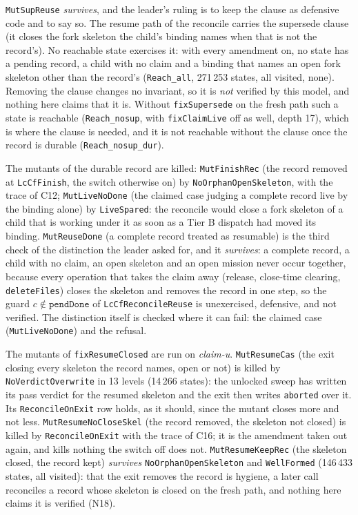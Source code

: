 \documentclass[a4paper,10pt,fleqn]{article}
\newcommand{\field}[1]{\texttt{#1}}
\begin{document}
\noindent \texttt{MutSupReuse} \emph{survives}, and the leader's ruling is
to keep the clause as defensive code and to say so. The resume path of the
reconcile carries the supersede clause (it closes the fork skeleton the
child's binding names when that is not the record's). No reachable state
exercises it: with every amendment on, no state has a pending
record, a child with no claim and a binding that names an open fork
skeleton other than the record's (\texttt{Reach\_all}, 271\,253 states, all
visited, none). Removing the clause changes no invariant, so it is \emph{not}
verified by this model, and nothing here claims that it is. Without
\field{fixSupersede} on the fresh path such a state is reachable
(\texttt{Reach\_nosup}, with \field{fixClaimLive} off as well, depth 17), which is where the clause is needed, and it is not reachable without the clause once the record is durable (\texttt{Reach\_nosup\_dur}).

\noindent The mutants of the durable record are killed: \texttt{MutFinishRec}
(the record removed at \field{LcCfFinish}, the switch otherwise on) by
\field{NoOrphanOpenSkeleton}, with the trace of C12; \texttt{MutLiveNoDone}
(the claimed case judging a complete record live by the binding alone) by
\field{LiveSpared}: the reconcile would close a fork skeleton of a child that
is working under it as soon as a Tier B dispatch had moved its binding.
\texttt{MutReuseDone} (a complete record treated as resumable) is the third
check of the distinction the leader asked for, and it \emph{survives}: a
complete record, a child with no claim, an open skeleton and an open mission
never occur together, because every operation that takes the claim away
(release, close-time clearing, \field{deleteFiles}) closes the skeleton and
removes the record in one step, so the guard $c\notin\field{pendDone}$ of
\field{LcCfReconcileReuse} is unexercised, defensive, and not verified. The
distinction itself is checked where it can fail: the claimed case
(\texttt{MutLiveNoDone}) and the refusal.

\noindent The mutants of \field{fixResumeClosed} are run on \emph{claim-u}.
\texttt{MutResumeCas} (the exit closing every skeleton the record names,
open or not) is killed by \field{NoVerdictOverwrite} in 13 levels
(14\,266 states): the unlocked sweep has written its pass verdict for the
resumed skeleton and the exit then writes \field{aborted} over it. Its
\field{ReconcileOnExit} row holds, as it should, since the mutant closes more
and not less. \texttt{MutResumeNoCloseSkel} (the record removed, the skeleton
not closed) is killed by \field{ReconcileOnExit} with the trace of C16; it is
the amendment taken out again, and kills nothing the switch off does not.
\texttt{MutResumeKeepRec} (the skeleton closed, the record kept) \emph{survives}
\field{NoOrphanOpenSkeleton} and \field{WellFormed} (146\,433 states, all
visited): that the exit removes the record is hygiene, a later call reconciles
a record whose skeleton is closed on the fresh path, and nothing here claims it
is verified (N18).
\end{document}
